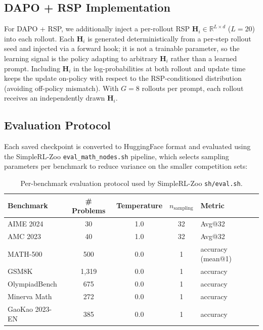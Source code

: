\subsection{DAPO + RSP Implementation}\label{app:dapo_rsp_impl}

For DAPO + RSP, we additionally inject a per-rollout RSP $\mathbf{H}_i \in \mathbb{R}^{L \times d}$ ($L=20$) into each rollout. Each $\mathbf{H}_i$ is generated deterministically from a per-step rollout seed and injected via a forward hook; it is not a trainable parameter, so the learning signal is the policy adapting to arbitrary $\mathbf{H}_i$ rather than a learned prompt. Including $\mathbf{H}_i$ in the log-probabilities at both rollout and update time keeps the update on-policy with respect to the RSP-conditioned distribution (avoiding off-policy mismatch). With $G=8$ rollouts per prompt, each rollout receives an independently drawn $\mathbf{H}_i$.

\subsection{Evaluation Protocol}

Each saved checkpoint is converted to HuggingFace format and evaluated using the SimpleRL-Zoo \texttt{eval\_math\_nodes.sh} pipeline, which selects sampling parameters per benchmark to reduce variance on the smaller competition sets:

\begin{table}[H]
\centering
\caption{Per-benchmark evaluation protocol used by SimpleRL-Zoo \texttt{sh/eval.sh}.}
\label{tab:dapo_eval_protocol}
\footnotesize
\setlength{\tabcolsep}{6pt}
\renewcommand{\arraystretch}{0.9}
\begin{tabular}{lcccl}
\toprule
\textbf{Benchmark} & \textbf{\# Problems} & \textbf{Temperature} & \textbf{$n_{\text{sampling}}$} & \textbf{Metric} \\
\midrule
AIME 2024       & 30    & 1.0 & 32 & Avg@32 \\
AMC 2023        & 40    & 1.0 & 32 & Avg@32 \\
MATH-500        & 500   & 0.0 & 1  & accuracy (mean@1) \\
GSM8K           & 1{,}319 & 0.0 & 1  & accuracy \\
OlympiadBench   & 675   & 0.0 & 1  & accuracy \\
Minerva Math    & 272   & 0.0 & 1  & accuracy \\
GaoKao 2023-EN  & 385   & 0.0 & 1  & accuracy \\
\bottomrule
\end{tabular}
\end{table}


